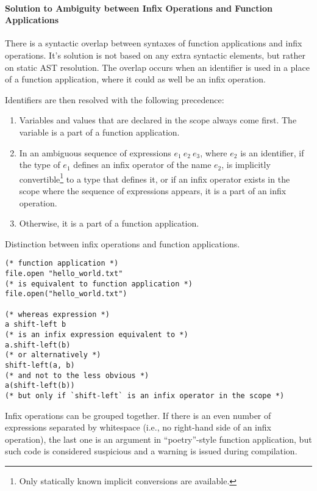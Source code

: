\paragraph{Solution to Ambiguity between Infix Operations and Function Applications}

There is a syntactic overlap between syntaxes of function applications and infix operations. It's solution is not based on any extra syntactic elements, but rather on static AST resolution. The overlap occurs when an identifier is used in a place of a function application, where it could as well be an infix operation. 

Identifiers are then resolved with the following precedence:
\begin{enumerate}
  \item Variables and values that are declared in the scope always come first. The variable is a part of a function application. 
  \item In an ambiguous sequence of expressions $e_1\ e_2\ e_3$, where $e_2$ is an identifier, if the type of $e_1$ defines an infix operator of the name $e_2$, is implicitly convertible\footnote{Only statically known implicit conversions are available.} to a type that defines it, or if an infix operator exists in the scope where the sequence of expressions appears, it is a part of an infix operation. 
  \item Otherwise, it is a part of a function application.  
\end{enumerate}

\example Distinction between infix operations and function applications. 
\begin{lstlisting}[deletekeywords={open}]
(* function application *)
file.open "hello_world.txt"
(* is equivalent to function application *)
file.open("hello_world.txt")

(* whereas expression *)
a shift-left b
(* is an infix expression equivalent to *)
a.shift-left(b)
(* or alternatively *)
shift-left(a, b)
(* and not to the less obvious *)
a(shift-left(b))
(* but only if `shift-left` is an infix operator in the scope *)
\end{lstlisting}

Infix operations can be grouped together. If there is an even number of expressions separated by whitespace (i.e., no right-hand side of an infix operation), the last one is an argument in ``poetry''-style function application, but such code is considered suspicious and a warning is issued during compilation. 





